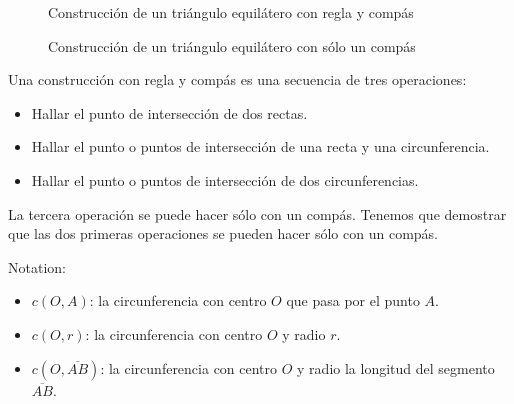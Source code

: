 \begin{figure}[b]
\begin{minipage}{.45\textwidth}
\begin{center}
\caption{Construcción de un triángulo equilátero con regla y compás}\label{f.compass-equi}
\end{center}
\end{minipage}
\hfill
\begin{minipage}{.45\textwidth}
\begin{center}
\caption{Construcción de un triángulo equilátero con sólo un compás}\label{f.compass-equi-only}
\end{center}
\end{minipage}
\end{figure}

Una construcción con regla y compás es una secuencia de tres operaciones:
\begin{itemize}
\item Hallar el punto de intersección de dos rectas.
\item Hallar el punto o puntos de intersección de una recta y una circunferencia.
\item Hallar el punto o puntos de intersección de dos circunferencias.
\end{itemize}
La tercera operación se puede hacer sólo con un compás. Tenemos que demostrar que las dos primeras operaciones se pueden hacer sólo con un compás.

\noindent{}Notation:
\begin{itemize}
\item $c(O,A)$: la circunferencia con centro $O$ que pasa por el punto $A$.
\item $c(O,r)$: la circunferencia con centro $O$ y radio $r$.
\item $c(O,\overline{AB})$: la circunferencia con centro $O$ y radio la longitud del segmento $\overline{AB}$.
\end{itemize}

